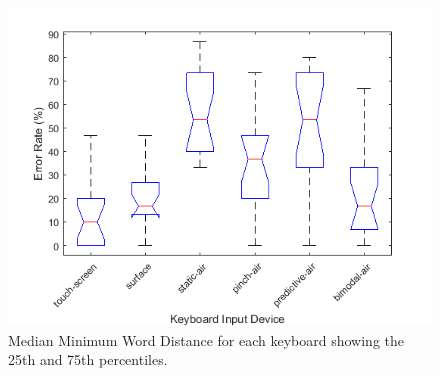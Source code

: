 \begin{figure}[t]
	\centering
	\includegraphics{Figures/fig_MWD_boxplot}
	\caption[Minimum Word Distance Boxplot]{Median Minimum Word Distance for each keyboard showing the 25th and 75th percentiles.}
	\label{fig_MWD_boxplot}
\end{figure}


